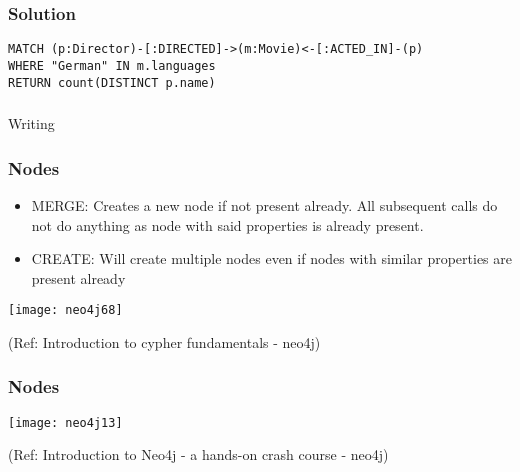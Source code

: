 \begin{frame}[fragile]\frametitle{Solution}

\begin{lstlisting}
MATCH (p:Director)-[:DIRECTED]->(m:Movie)<-[:ACTED_IN]-(p)
WHERE "German" IN m.languages
RETURN count(DISTINCT p.name)
\end{lstlisting}	


\end{frame}


\begin{frame}[fragile]\frametitle{}
\begin{center}
{\Large Writing}
\end{center}
\end{frame}



\begin{frame}[fragile]\frametitle{Nodes}

\begin{itemize}
\item MERGE: Creates a new node if not present already. All subsequent calls do not do anything as node with said properties is already present.

\item CREATE: Will create multiple nodes even if nodes with similar properties are present already
\end{itemize}

\begin{center}
\texttt{[image: neo4j68]}
\end{center}	  


{\tiny (Ref: Introduction to cypher fundamentals  - neo4j)}

\end{frame}

\begin{frame}[fragile]\frametitle{Nodes}


\begin{center}
\texttt{[image: neo4j13]}
\end{center}	  


{\tiny (Ref: Introduction to Neo4j - a hands-on crash course  - neo4j)}

\end{frame}


